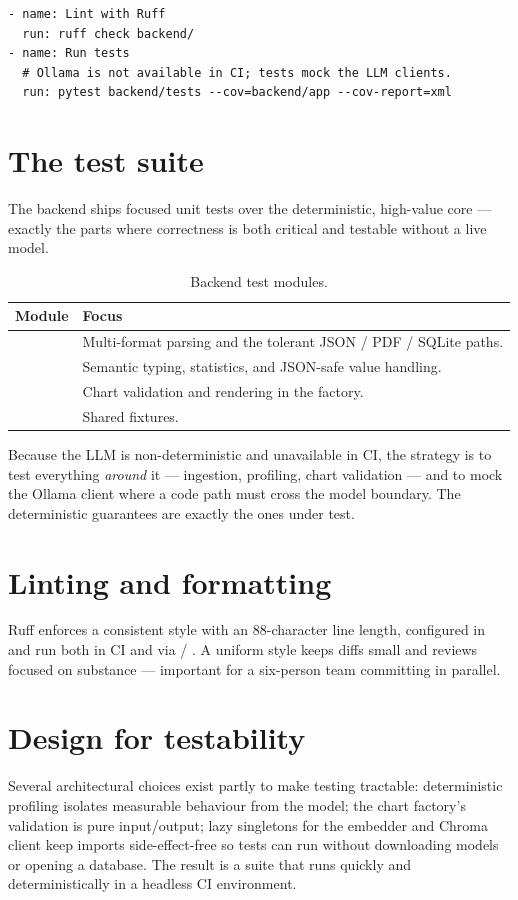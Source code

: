 \begin{lstlisting}[style=bash,caption={Backend CI steps.}]
- name: Lint with Ruff
  run: ruff check backend/
- name: Run tests
  # Ollama is not available in CI; tests mock the LLM clients.
  run: pytest backend/tests --cov=backend/app --cov-report=xml
\end{lstlisting}

\section{The test suite}
The backend ships focused unit tests over the deterministic, high-value core ---
exactly the parts where correctness is both critical and testable without a live
model.

\begin{table}[h]
\centering
\caption{Backend test modules.}
\small
\begin{tabularx}{\linewidth}{@{}L{3.8cm} X@{}}
\toprule
\textbf{Module} & \textbf{Focus} \\
\midrule
{} & Multi-format parsing and the tolerant JSON / PDF /
SQLite paths. \\
 & Semantic typing, statistics, and JSON-safe value
handling. \\
 & Chart validation and rendering in the factory. \\
 & Shared fixtures. \\
\bottomrule
\end{tabularx}
\end{table}

\begin{uanote}
Because the LLM is non-deterministic and unavailable in CI, the strategy is to
test everything \emph{around} it --- ingestion, profiling, chart validation ---
and to mock the Ollama client where a code path must cross the model boundary.
The deterministic guarantees are exactly the ones under test.
\end{uanote}

\section{Linting and formatting}
Ruff enforces a consistent style with an 88-character line length, configured in
 and run both in CI and via  /
. A uniform style keeps diffs small and reviews focused on
substance --- important for a six-person team committing in parallel.

\section{Design for testability}
Several architectural choices exist partly to make testing tractable:
deterministic profiling isolates measurable behaviour from the model; the chart
factory's validation is pure input/output; lazy singletons for the embedder and
Chroma client keep imports side-effect-free so tests can run without downloading
models or opening a database. The result is a suite that runs quickly and
deterministically in a headless CI environment.

